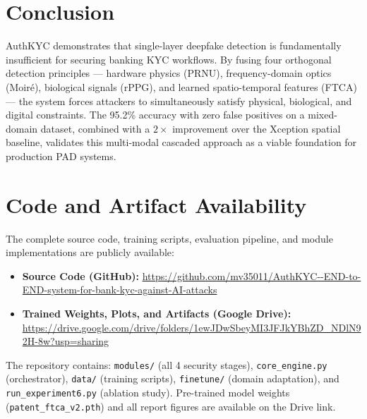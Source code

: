 \documentclass[10pt,twocolumn]{IEEEtran}
\begin{document}
\section{Conclusion}
\label{sec:conc}

AuthKYC demonstrates that single-layer deepfake detection is fundamentally insufficient for securing banking KYC workflows. By fusing four orthogonal detection principles --- hardware physics (PRNU), frequency-domain optics (Moiré), biological signals (rPPG), and learned spatio-temporal features (FTCA) --- the system forces attackers to simultaneously satisfy physical, biological, and digital constraints. The 95.2\% accuracy with zero false positives on a mixed-domain dataset, combined with a $2\times$ improvement over the Xception spatial baseline, validates this multi-modal cascaded approach as a viable foundation for production PAD systems.

\section{Code and Artifact Availability}
\label{sec:availability}

The complete source code, training scripts, evaluation pipeline, and module implementations are publicly available:

\begin{itemize}
  \item \textbf{Source Code (GitHub):} \url{https://github.com/mv35011/AuthKYC--END-to-END-system-for-bank-kyc-against-AI-attacks}
  \item \textbf{Trained Weights, Plots, and Artifacts (Google Drive):} \url{https://drive.google.com/drive/folders/1ewJDwSbeyMI3JFJkYBhZD_NDlN92H-8w?usp=sharing}
\end{itemize}

The repository contains: \texttt{modules/} (all 4 security stages), \texttt{core\_engine.py} (orchestrator), \texttt{data/} (training scripts), \texttt{finetune/} (domain adaptation), and \texttt{run\_experiment6.py} (ablation study). Pre-trained model weights (\texttt{patent\_ftca\_v2.pth}) and all report figures are available on the Drive link.
\end{document}
